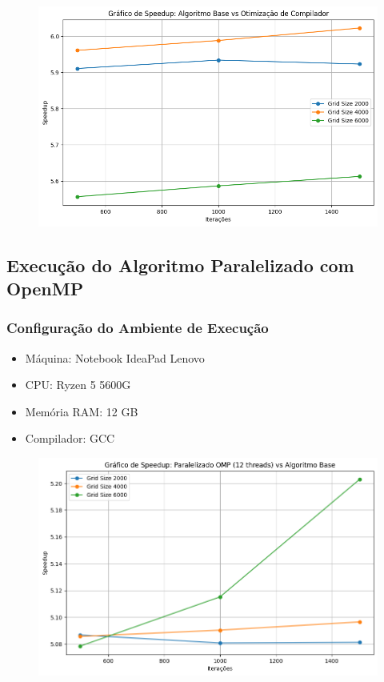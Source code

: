 \begin{figure}[H]
    \centering
    \includegraphics[width=1\linewidth]{./image.png}
    \label{fig:Runtimexblock}
\end{figure}


\subsection{Execução do Algoritmo Paralelizado com OpenMP}
\subsubsection{Configuração do Ambiente de Execução}
\begin{itemize}
    \item Máquina: Notebook IdeaPad Lenovo
    \item CPU: Ryzen 5 5600G
    \item Memória RAM: 12 GB
    \item Compilador: GCC
\end{itemize}

\begin{figure}[H]
    \centering
    \includegraphics[width=1\linewidth]{./image copy.png}
    \label{fig:Runtimexblock}
\end{figure}

